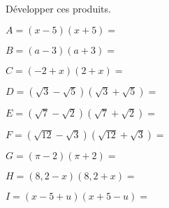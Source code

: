 
Développer ces produits.

\begin{minipage}{5cm}
\begin{description}
\item $A=(x-5)(x+5)=$ 
\item $B=(a-3)(a+3)=$ 
\item $C=(-2+x)(2+x)=$ 
\end{description}
\end{minipage}
\begin{minipage}{5cm}
\begin{description}
\item $D=\left(\sqrt{3}-\sqrt{5}\right)\left(\sqrt{3}+\sqrt{5}\right)=$ 
\item $E=\left(\sqrt{7}-\sqrt{2}\right)\left(\sqrt{7}+\sqrt{2}\right)=$ 
\item $F=\left(\sqrt{12}-\sqrt{3}\right)\left(\sqrt{12}+\sqrt{3}\right)=$ 
\end{description}
\end{minipage}
\begin{minipage}{5cm}
\begin{description}
\item $G=(\pi-2)(\pi+2)=$ 
\item $H=(8,2-x)(8,2+x)=$ 
\item $I=(x-5+u)(x+5-u)=$ 
\end{description}
\end{minipage}